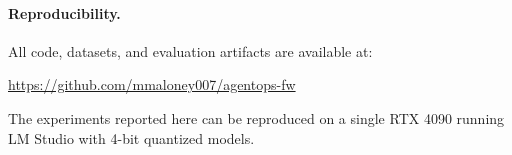 \documentclass[11pt]{article}
\begin{document}
\paragraph{Reproducibility.}
All code, datasets, and evaluation artifacts are available at:
\begin{center}
\url{https://github.com/mmaloney007/agentops-fw}
\end{center}
The experiments reported here can be reproduced on a single RTX 4090 running LM Studio with 4-bit quantized models.



\end{document}
